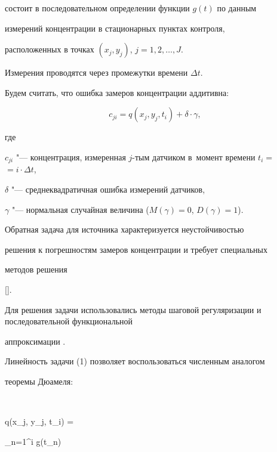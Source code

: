 состоит в последовательном определении функции $g(t)$ по данным


измерений концентрации в стационарных пунктах контроля, 


расположенных в точках $(x_j, y_j)$,  $j=1,  2,  \ldots,  J$.


 Измерения проводятся через промежутки времени $\Delta t$. %





 Будем считать,  что ошибка замеров концентрации аддитивна:


 $$


    c_{ji} = q(x_j, y_j, t_i) + \delta \cdot \gamma, 


 $$


где


 $c_{ji}$ "--- концентрация,  измеренная $j$-тым датчиком в~момент времени $t_i=$ \linebreak $ = i \cdot \Delta t$, 


 $\delta$ "--- среднеквадратичная ошибка измерений датчиков, 


 $\gamma$ "--- нормальная случайная величина ($M(\gamma)=0$,  $D(\gamma)=1$). %





 Обратная задача для источника характеризуется неустойчивостью


решения к погрешностям замеров концентрации и требует специальных


методов решения


 [].


 Для решения задачи использовались методы шаговой регуляризации и последовательной функциональной


аппроксимации \cite{chubatov:Alifanov,  chubatov:Beck}.













 Линейность задачи (1) позволяет воспользоваться численным аналогом


теоремы Дюамеля:


 $$


   q(x_j, y_j, t_i) =


    \sum \limits_{n=1}^{i} g(t_n) \cdot


